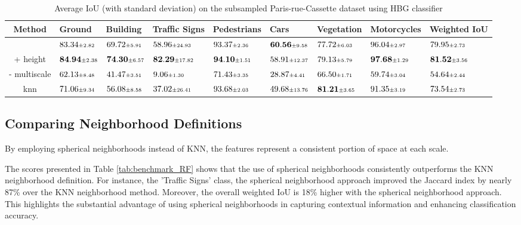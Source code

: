 \documentclass{article}
\begin{document}
\begin{table}
    \hspace*{-3cm}
    \begin{tabular}{cllllllll}
        Method & Ground & Building & Traffic Signs & Pedestrians & Cars & Vegetation & Motorcycles & Weighted IoU \\
        \hline
        \cite{thomas_semantic_2018} & $83.34 \mtiny{\pm 2.82}$ & $69.72 \mtiny{\pm 5.91}$ & $58.96 \mtiny{\pm 24.93}$ & $93.37 \mtiny{\pm 2.36}$ & $\mathbf{60.56} \mtiny{\pm 9.58}$ & $77.72 \mtiny{\pm 6.03}$ & $96.04 \mtiny{\pm 2.97}$ & $79.95 \mtiny{\pm 2.73}$ \\
        + height & $\mathbf{84.94} \mtiny{\pm 2.38}$ & $\mathbf{74.30} \mtiny{\pm 6.57}$ & $\mathbf{82.29} \mtiny{\pm 17.82}$ & $\mathbf{94.10} \mtiny{\pm 1.51}$ & $58.91 \mtiny{\pm 12.37}$ & $79.13 \mtiny{\pm 5.79}$ & $\mathbf{97.68} \mtiny{\pm 1.29}$ & $\mathbf{81.52} \mtiny{\pm 3.56}$ \\
        - multiscale & $62.13 \mtiny{\pm 8.48}$ & $41.47 \mtiny{\pm 3.51}$ & $9.06 \mtiny{\pm 1.30}$ & $71.43 \mtiny{\pm 3.35}$ & $28.87 \mtiny{\pm 4.41}$ & $66.50 \mtiny{\pm 1.71}$ & $59.74 \mtiny{\pm 3.04}$ & $54.64 \mtiny{\pm 2.44}$ \\
        knn & $71.06 \mtiny{\pm 9.34}$ & $56.08 \mtiny{\pm 8.58}$ & $37.02 \mtiny{\pm 26.41}$ & $93.68 \mtiny{\pm 2.03}$ & $49.68 \mtiny{\pm 13.76}$ & $\mathbf{81.21} \mtiny{\pm 3.65}$ & $91.35 \mtiny{\pm 3.19}$ & $73.54 \mtiny{\pm 2.73}$ \\
\end{tabular}
    \caption{Average IoU (with standard deviation) on the subsampled Paris-rue-Cassette dataset using HBG classifier}
    \label{tab:benchmark_Boosting}
\end{table}

\subsection{Comparing Neighborhood Definitions}\label{sec:compare_neigh_def}
By employing spherical neighborhoods instead of KNN, the features represent a consistent portion of space at each scale.

The scores presented in Table \ref{tab:benchmark_RF} shows that the use of spherical neighborhoods consistently outperforms the KNN neighborhood definition. For instance, the 'Traffic Signs' class, the spherical neighborhood approach improved the Jaccard index by nearly 87\% over the KNN neighborhood method. Moreover, the overall weighted IoU is 18\% higher with the spherical neighborhood approach. This highlights the substantial advantage of using spherical neighborhoods in capturing contextual information and enhancing classification accuracy.
\end{document}
